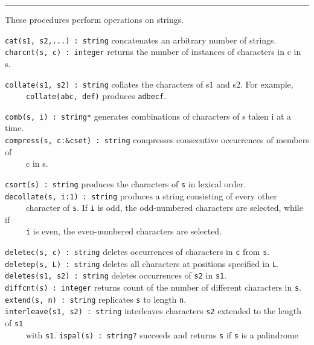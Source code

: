 \vspace{0.25cm}\hrule{}

These procedures perform operations on strings. 

\texttt{cat(s1, s2,...) : string} concatenates an arbitrary number of
strings.\\
\texttt{charcnt(s, c) : integer} returns the number of instances of
characters in c in s.

\texttt{collate(s1, s2) : string} collates the characters
of s1 and s2. For example,\\
 \ \ \ \ \ \texttt{collate({\textquotedbl}abc{\textquotedbl},
{\textquotedbl}def{\textquotedbl})} produces
\texttt{{\textquotedbl}adbecf{\textquotedbl}}.

\texttt{comb(s, i) : string*} generates combinations of characters of s taken i at a time.\\
\texttt{compress(s, c:\&cset) : string} compresses consecutive
occurrences of members of\\
 \ \ \ \ \ c in s.

\texttt{csort(s) : string} produces the characters of \texttt{s} in
lexical order.\\
\texttt{decollate(s, i:1) : string} produces a string consisting of
every other\\
 \ \ \ \ \ character of \texttt{s}. If \texttt{i} is odd, the
odd-numbered characters are selected, while if\\
 \ \ \ \ \ \texttt{i} is even, the even-numbered characters are selected.

\texttt{deletec(s, c) : string} deletes occurrences of characters in
\texttt{c} from \texttt{s}.\\
\texttt{deletep(s, L) : string} deletes all characters at positions
specified in \texttt{L}.\\
\texttt{deletes(s1, s2) : string} deletes occurrences of \texttt{s2} in
\texttt{s1}.\\
\texttt{diffcnt(s) : integer} returns count of the number of different
characters in \texttt{s}.\\
\texttt{extend(s, n) : string} replicates \texttt{s} to length
\texttt{n}.\\
\texttt{interleave(s1, s2) : string} interleaves characters \texttt{s2}
extended to the length of \texttt{s1}\\
 \ \ \ \ \  with \texttt{s1}.
\texttt{ispal(s) : string?} succeeds and returns \texttt{s} if
\texttt{s} is a palindrome

